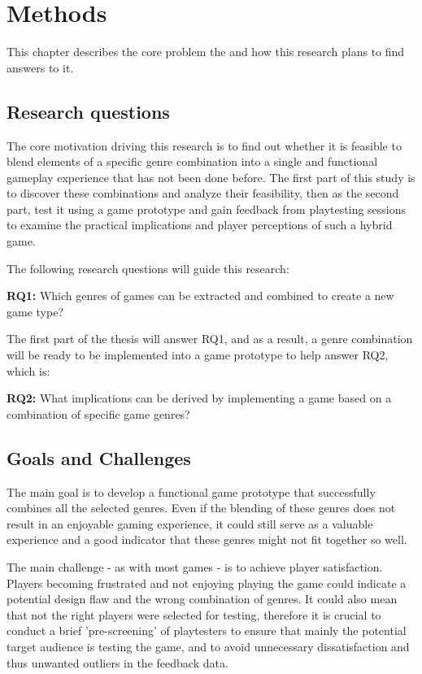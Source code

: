 \chapter{Methods} \label{Chapter:Methods}

This chapter describes the core problem the and how this research plans to find answers to it.



\section{Research questions}

The core motivation driving this research is to find out whether it is feasible to blend elements of a specific genre combination into a single and functional gameplay experience that has not been done before. The first part of this study is to discover these combinations and analyze their feasibility, then as the second part, test it using a game prototype and gain feedback from playtesting sessions to examine the practical implications and player perceptions of such a hybrid game.

The following research questions will guide this research:

\textbf{RQ1:} Which genres of games can be extracted and combined to create a new game type?

The first part of the thesis will answer RQ1, and as a result, a genre combination will be ready to be implemented into a game prototype to help answer RQ2, which is:

\textbf{RQ2:} What implications can be derived by implementing a game based on a combination of specific game genres?



\section{Goals and Challenges}

The main goal is to develop a functional game prototype that successfully combines all the selected genres. Even if the blending of these genres does not result in an enjoyable gaming experience, it could still serve as a valuable experience and a good indicator that these genres might not fit together so well.

The main challenge - as with most games - is to achieve player satisfaction. Players becoming frustrated and not enjoying playing the game could indicate a potential design flaw and the wrong combination of genres. It could also mean that not the right players were selected for testing, therefore it is crucial to conduct a brief 'pre-screening' of playtesters to ensure that mainly the potential target audience is testing the game, and to avoid unnecessary dissatisfaction and thus unwanted outliers in the feedback data.



